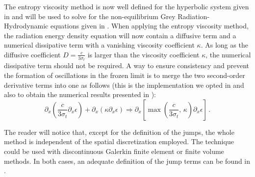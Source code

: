 \documentclass[review]{elsarticle}
\begin{document}
The entropy viscosity method is now well defined for the hyperbolic system given in  and will be used to solve for the non-equilibrium Grey Radiation-Hydrodynamic equations given in . 
When applying the entropy viscosity method, the radiation energy density equation will now contain a diffusive term and a numerical dissipative term with a vanishing viscosity coefficient $\kappa$. As long as the diffusive coefficient $D=\frac{c}{3 \sigma_t}$ is larger than the viscosity coefficient $\kappa$, the numerical dissipative term should not be required. A way to ensure consistency and prevent the formation of oscillations in the frozen limit is to merge the two second-order derivative terms into one as follows (this is the implementation we opted in \cite{our_jcp_radhy_paper} and also to obtain the numerical results presented in ):
%
\begin{equation}
 \partial_x \left( \frac{c}{3 \sigma_t} \partial_x \epsilon \right) + \partial_x \left( \kappa \partial_x \epsilon \right) 
 \Longrightarrow
 \partial_x \left[ \max\left(\frac{c}{3 \sigma_t} \text{, } \kappa \right) \partial_x \epsilon \right] \,.
\end{equation}
%
%
 \begin{remark}
The reader will notice that, except for the definition of the jumps, the whole method is independent of the spatial discretization employed. The technique could be used with discontinuous Galerkin finite element or finite volume methods. In both cases, an adequate  definition of the jump terms can be found in \cite{valentin}.
 \end{remark}
%
\end{document}
